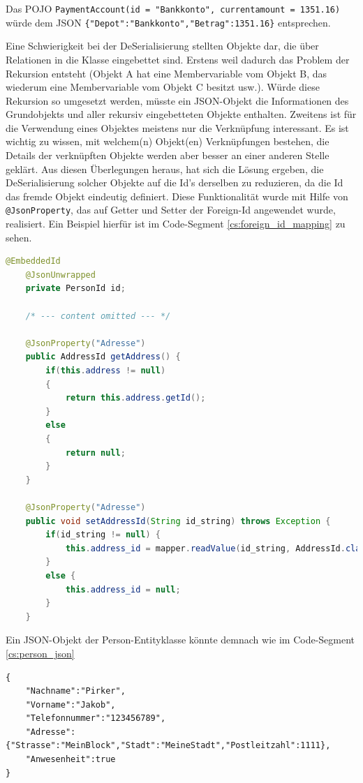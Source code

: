 Das POJO \verb|PaymentAccount(id = "Bankkonto", currentamount = 1351.16)| würde \newline dem JSON \verb|{"Depot":"Bankkonto","Betrag":1351.16}| entsprechen.


Eine Schwierigkeit bei der DeSerialisierung stellten Objekte dar, die über Relationen in die Klasse eingebettet sind. Erstens weil dadurch das Problem der Rekursion entsteht (Objekt A hat eine Membervariable vom Objekt B, das wiederum eine Membervariable vom Objekt C besitzt usw.). Würde diese Rekursion so umgesetzt werden, müsste ein JSON-Objekt die Informationen des Grundobjekts und aller rekursiv eingebetteten Objekte enthalten. Zweitens ist für die Verwendung eines Objektes meistens nur die Verknüpfung interessant. Es ist wichtig zu wissen, mit welchem(n) Objekt(en) Verknüpfungen bestehen, die Details der verknüpften Objekte werden aber besser an einer anderen Stelle geklärt. Aus diesen Überlegungen heraus, hat sich die Lösung ergeben, die DeSerialisierung solcher Objekte auf die Id's derselben zu reduzieren, da die Id das fremde Objekt eindeutig definiert. Diese Funktionalität wurde mit Hilfe von \verb|@JsonProperty|, das auf Getter und Setter der Foreign-Id angewendet wurde, realisiert. Ein Beispiel hierfür ist im Code-Segment \ref{cs:foreign_id_mapping} zu sehen.

\scriptsize
\begin{lstlisting}[caption=Foreign-Id mapping für die Address-Entity in Person.java, label=cs:foreign_id_mapping, language=Java]
	@EmbeddedId
	@JsonUnwrapped
	private PersonId id;
	
	/* --- content omitted --- */
	
	@JsonProperty("Adresse")
	public AddressId getAddress() {
	   	if(this.address != null)
	   	{
	   		return this.address.getId();
	   	}
	   	else
	   	{
	   		return null;
	   	}
	}
	
	@JsonProperty("Adresse")
	public void setAddressId(String id_string) throws Exception {
	   	if(id_string != null) {
	   		this.address_id = mapper.readValue(id_string, AddressId.class);
	   	}
	   	else {
	   		this.address_id = null;
	   	}
	}
\end{lstlisting}
\normalsize

Ein JSON-Objekt der Person-Entityklasse könnte demnach wie im Code-Segment \ref{cs:person_json}

\scriptsize
\begin{lstlisting}[label = cs:person_json, caption = Beispiel für ein Serialisiertes JSON-Objekt]
{	
	"Nachname":"Pirker",
	"Vorname":"Jakob",
	"Telefonnummer":"123456789",
	"Adresse":{"Strasse":"MeinBlock","Stadt":"MeineStadt","Postleitzahl":1111},
	"Anwesenheit":true
}
\end{lstlisting}
\normalsize

